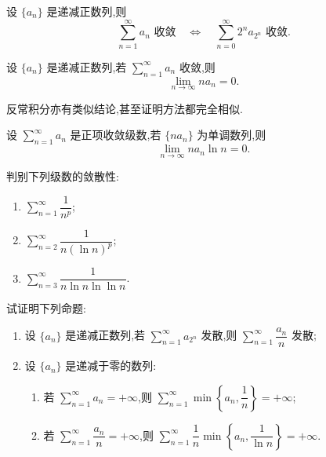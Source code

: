 \documentclass[../../数学分析培优讲义.tex]{subfiles}
\begin{document}

\begin{theorem}
设 $\{a_n\}$ 是递减正数列,则
\[
    \sum\limits_{n=1}^{\infty}a_n\text{ 收敛}
    \quad\Longleftrightarrow\quad
    \sum\limits_{n=0}^{\infty}2^na_{2^n}\text{ 收敛}.
\]
\end{theorem}

\begin{proposition}[\markstar]
设 $\{a_n\}$ 是递减正数列,若 $\displaystyle\sum\limits_{n=1}^{\infty}a_n$ 收敛,则
\[
    \lim\limits_{n\to\infty}na_n=0.
\]
\end{proposition}

\begin{remark}
反常积分亦有类似结论,甚至证明方法都完全相似.
\end{remark}

\begin{example}
设 $\displaystyle\sum\limits_{n=1}^{\infty}a_n$ 是正项收敛级数,若 $\{na_n\}$ 为单调数列,则
\[
    \lim\limits_{n\to\infty}na_n\ln n=0.
\]
\end{example}
\exampleblank

\begin{example}
判别下列级数的敛散性:
\begin{enumerate}[label=(\arabic*)]
    \item $\displaystyle\sum\limits_{n=1}^{\infty}\dfrac{1}{n^p}$;
    \item $\displaystyle\sum\limits_{n=2}^{\infty}\dfrac{1}{n(\ln n)^p}$;
    \item $\displaystyle\sum\limits_{n=3}^{\infty}\dfrac{1}{n\ln n\ln\ln n}$.
\end{enumerate}
\end{example}
\exampleblank

\begin{example}
试证明下列命题:
\begin{enumerate}[label=(\arabic*)]
    \item 设 $\{a_n\}$ 是递减正数列,若 $\displaystyle\sum\limits_{n=1}^{\infty}a_{2^n}$ 发散,则 $\displaystyle\sum\limits_{n=1}^{\infty}\dfrac{a_n}{n}$ 发散;
    \item 设 $\{a_n\}$ 是递减于零的数列:
    \begin{enumerate}[label=(\roman*)]
        \item 若 $\displaystyle\sum\limits_{n=1}^{\infty}a_n=+\infty$,则 $\displaystyle\sum\limits_{n=1}^{\infty}\min\left\{a_n,\dfrac{1}{n}\right\}=+\infty$;
        \item 若 $\displaystyle\sum\limits_{n=1}^{\infty}\dfrac{a_n}{n}=+\infty$,则 $\displaystyle\sum\limits_{n=1}^{\infty}\dfrac{1}{n}\min\left\{a_n,\dfrac{1}{\ln n}\right\}=+\infty$.
    \end{enumerate}
\end{enumerate}
\end{example}
\exampleblank
\end{document}
